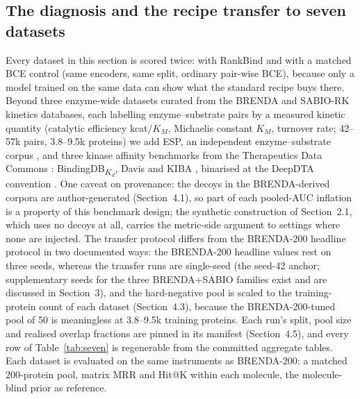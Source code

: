 \documentclass[11pt,a4paper]{article}
\newcommand{\method}{RankBind\xspace}
\newcommand{\mrr}{matrix MRR}
\begin{document}
\subsection{The diagnosis and the recipe transfer to seven datasets}
\label{sec:transfer}

Every dataset in this section is scored twice: with \method{} and with a
matched BCE control (same encoders, same split, ordinary pair-wise BCE),
because only a model trained on the same data can show what the standard
recipe buys there. Beyond three enzyme-wide datasets curated from the BRENDA
and SABIO-RK kinetics databases, each labelling enzyme--substrate pairs by a
measured kinetic quantity (catalytic efficiency kcat/$K_M$, Michaelis
constant $K_M$, turnover rate; 42--57k pairs, 3.8--9.5k proteins) we add
ESP,
an independent enzyme--substrate corpus \citep{kroll2023esp}, and three
kinase affinity benchmarks from the Therapeutics Data Commons
\citep{huang2021tdc}: BindingDB\textsubscript{$K_d$}, Davis
\citep{davis2011kinase} and KIBA \citep{tang2014kiba}, binarised at the
DeepDTA convention \citep{ozturk2018deepdta}. One caveat on provenance:
the decoys in the BRENDA-derived corpora are author-generated
(Section~4.1), so part of each pooled-AUC inflation is a property of this
benchmark design; the synthetic construction of Section~2.1, which uses no
decoys at all, carries the metric-side argument to settings where none are
injected. The transfer protocol differs from the BRENDA-200 headline
protocol in two documented ways: the BRENDA-200 headline values rest on
three seeds, whereas the transfer runs are single-seed (the seed-42
anchor; supplementary seeds for the three BRENDA+SABIO families exist and
are discussed in Section~3), and the hard-negative pool is scaled to the
training-protein count of each dataset (Section~4.3), because the
BRENDA-200-tuned pool of 50 is meaningless at 3.8--9.5k training proteins.
Each run's split, pool size and realised overlap fractions are pinned in
its manifest (Section~4.5), and every row of Table~\ref{tab:seven} is
regenerable from the committed aggregate tables. Each dataset is evaluated on
the same instruments as BRENDA-200: a matched 200-protein pool, \mrr{} and
Hit@K within each molecule, the molecule-blind prior as reference.
\end{document}
